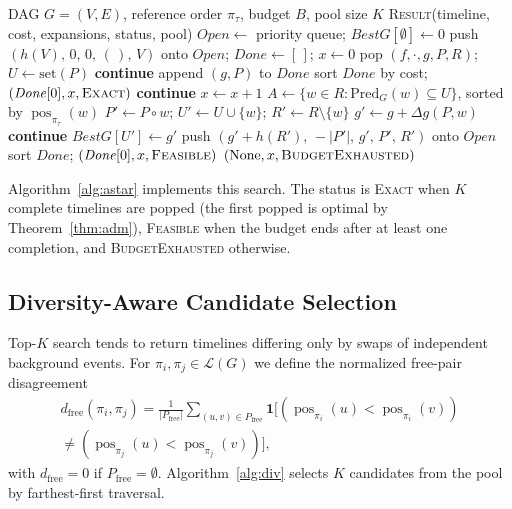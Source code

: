 \documentclass{ieeeaccess}
\newcommand{\Pfree}{P_{\mathrm{free}}}
\newcommand{\dfree}{d_{\mathrm{free}}}
\DeclareMathOperator{\pos}{pos}
\newcommand{\ind}{\mathbf{1}}
\newcommand{\Lin}{\mathcal{L}}
\begin{document}
\begin{algorithm}[!t]
\caption{Bounded A* with Dominance Pruning}\label{alg:astar}
\footnotesize
\begin{algorithmic}[1]
\Require DAG $G=(V,E)$, reference order $\pi_\tau$, budget $B$, pool size $K$
\Ensure \textsc{Result}(timeline, cost, expansions, status, pool)
\State $\mathit{Open}\gets$ priority queue; $\mathit{BestG}[\emptyset]\gets 0$
\State push $(h(V),\,0,\,0,\,(\,),\,V)$ onto $\mathit{Open}$; $\mathit{Done}\gets[\,]$; $x\gets 0$
  \State pop $(f,\cdot,g,P,R)$; $U\gets\mathrm{set}(P)$
   \textbf{continue} 
  \EndIf
    \State append $(g,P)$ to $\mathit{Done}$
     \State sort $\mathit{Done}$ by cost; \Return $(\mathit{Done}[0],x,\textsc{Exact})$
    \EndIf
    \State \textbf{continue}
  \EndIf
  \State $x\gets x+1$
  \State $A\gets\{w\in R:\mathrm{Pred}_G(w)\subseteq U\}$, sorted by $\pos_{\pi_\tau}(w)$
    \State $P'\gets P\circ w$; $U'\gets U\cup\{w\}$; $R'\gets R\setminus\{w\}$
    \State $g'\gets g+\Delta g(P,w)$
       \textbf{continue} 
      \EndIf
      \State $\mathit{BestG}[U']\gets g'$
    \EndIf
    \State push $(g'+h(R'),\,-|P'|,\,g',\,P',\,R')$ onto $\mathit{Open}$
  \EndFor
\EndWhile
{}
  \State sort $\mathit{Done}$; \Return $(\mathit{Done}[0],x,\textsc{Feasible})$
\Else
  \State \Return $(\mathrm{None},x,\textsc{BudgetExhausted})$
\EndIf
\end{algorithmic}
\end{algorithm}

Algorithm~\ref{alg:astar} implements this search. The status is \textsc{Exact} when $K$ complete timelines are popped (the first popped is optimal by Theorem~\ref{thm:adm}), \textsc{Feasible} when the budget ends after at least one completion, and \textsc{BudgetExhausted} otherwise.

\subsection{Diversity-Aware Candidate Selection}
Top-$K$ search tends to return timelines differing only by swaps of independent background events. For $\pi_i,\pi_j\in\Lin(G)$ we define the normalized free-pair disagreement
\begin{multline}
\dfree(\pi_i,\pi_j)=\frac{1}{|\Pfree|}\sum_{(u,v)\in\Pfree}\ind\big[(\pos_{\pi_i}(u)<\pos_{\pi_i}(v))\\
\neq(\pos_{\pi_j}(u)<\pos_{\pi_j}(v))\big],
\end{multline}
with $\dfree=0$ if $\Pfree=\emptyset$. Algorithm~\ref{alg:div} selects $K$ candidates from the pool by farthest-first traversal.
\end{document}
